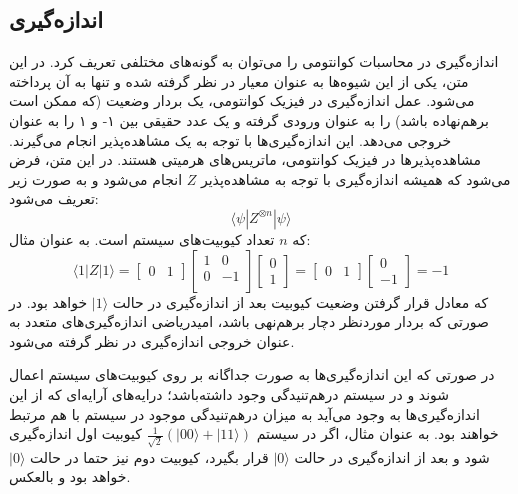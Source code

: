 \subsection{اندازه‌گیری}
اندازه‌گیری در محاسبات کوانتومی را می‌توان به گونه‌های مختلفی تعریف کرد. در این متن، یکی از این شیوه‌ها به عنوان معیار در نظر گرفته شده و تنها به آن پرداخته می‌شود.
عمل اندازه‌گیری در فیزیک کوانتومی، یک بردار وضعیت (که ممکن است برهم‌نهاده باشد) را به عنوان ورودی گرفته و یک عدد حقیقی بین
۱-
و
۱
را به عنوان خروجی می‌دهد.
این اندازه‌گیری‌ها با توجه به یک مشاهده‌پذیر  انجام می‌گیرند. مشاهده‌پذیرها در فیزیک کوانتومی، ماتریس‌های هرمیتی هستند. در این متن، فرض می‌شود که همیشه اندازه‌گیری با توجه به مشاهده‌پذیر 
$Z$
انجام می‌شود و به صورت زیر تعریف می‌شود:
\begin{equation}
    \langle \psi| Z^{\otimes n} | \psi\rangle
\end{equation}
\hsm
که
$n$
تعداد کیوبیت‌های سیستم است. به عنوان مثال:
\begin{equation}
    \langle 1 | Z | 1 \rangle = 
    \begin{bmatrix}
    0 & 1
    \end{bmatrix} 
    \begin{bmatrix}
    1 & 0 \\[3pt]
    0 & -1 \\[3pt]
    \end{bmatrix}
    \begin{bmatrix}
    0 \\[3pt] 1
    \end{bmatrix} 
    = \begin{bmatrix}
    0 & 1
    \end{bmatrix} 
    \begin{bmatrix}
    0 \\[3pt] -1
    \end{bmatrix}
    = -1
\end{equation}
\hsm
که معادل قرار گرفتن وضعیت کیوبیت بعد از اندازه‌گیری در حالت 
$|1\rangle$
خواهد بود. در صورتی که بردار موردنظر دچار برهم‌نهی باشد، امیدریاضی اندازه‌گیری‌های متعدد به عنوان خروجی اندازه‌گیری در نظر گرفته می‌شود.

در صورتی که این اندازه‌گیری‌ها به صورت جداگانه بر روی کیوبیت‌های سیستم اعمال شوند و در سیستم در‌هم‌تنیدگی وجود داشته‌باشد؛ درایه‌های آرایه‌ای که از این اندازه‌گیری‌ها به وجود می‌آید به میزان درهم‌تنیدگی موجود در سیستم با هم مرتبط خواهند بود. به عنوان مثال، اگر در سیستم
$\frac{1}{\sqrt{2}} (|00\rangle + |11\rangle)$
کیوبیت اول اندازه‌گیری شود و بعد از اندازه‌گیری در حالت 
$|0\rangle$
قرار بگیرد، کیوبیت دوم نیز حتما در حالت
$|0\rangle$
خواهد بود و بالعکس.

